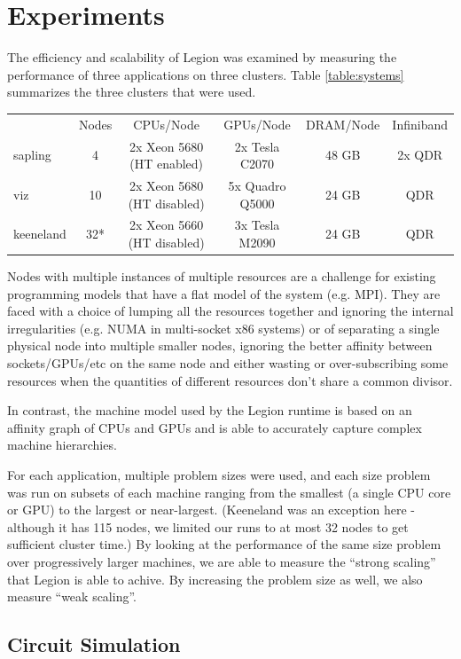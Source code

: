 \section{Experiments}
\label{sec:exp}

The efficiency and scalability of Legion was examined by measuring the performance
of three applications on three clusters.  Table \ref{table:systems} summarizes 
the three clusters that were used.

\begin{tabular}{lccccc}
 & Nodes & CPUs/Node & GPUs/Node & DRAM/Node & Infiniband \\
sapling & 4 & 2x Xeon 5680 (HT enabled) & 2x Tesla C2070 & 48 GB & 2x QDR \\
viz & 10 & 2x Xeon 5680 (HT disabled) & 5x Quadro Q5000 & 24 GB & QDR \\
keeneland & 32* & 2x Xeon 5660 (HT disabled) & 3x Tesla M2090 & 24 GB & QDR 
\end{tabular}

Nodes with multiple instances of multiple resources are a challenge for 
existing programming models that have a flat model of the system (e.g. MPI).
They are faced with a choice of lumping all 
the resources together and ignoring the internal irregularities (e.g. NUMA
in multi-socket x86 systems) or of separating a single physical node into
multiple smaller nodes, ignoring the better affinity between sockets/GPUs/etc
on the same node and either wasting or over-subscribing some resources when
the quantities of different resources don't share a common divisor.

In contrast, the machine model used by the Legion runtime is based on an
affinity graph of CPUs and GPUs and is able to accurately capture complex
machine hierarchies.

For each application, multiple problem sizes were used, and each size problem was
run on subsets of each machine ranging from the smallest (a single CPU core or GPU)
to the largest or near-largest.  (Keeneland was an exception here - although it has
115 nodes, we limited our runs to at most 32 nodes to get sufficient cluster time.)
By looking at the performance of the same size problem over progressively larger
machines, we are able to measure the ``strong scaling'' that Legion is able to
achive.  By increasing the problem size as well, we also measure ``weak scaling''.

\subsection{Circuit Simulation}
\label{subsec:exp_ckt}

